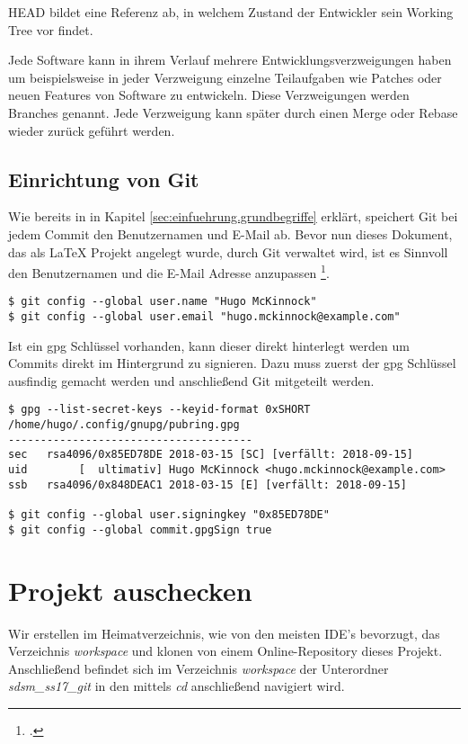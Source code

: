HEAD bildet eine Referenz ab, in welchem Zustand der Entwickler sein Working Tree vor findet. 

Jede Software kann in ihrem Verlauf mehrere Entwicklungsverzweigungen haben um beispielsweise in jeder Verzweigung einzelne Teilaufgaben wie Patches oder neuen Features von Software zu entwickeln. Diese Verzweigungen werden Branches genannt. Jede Verzweigung kann später durch einen Merge oder Rebase wieder zurück geführt werden.


\label{sec:einfuehrung.git}
\subsection{Einrichtung von Git}
Wie bereits in in Kapitel \ref{sec:einfuehrung.grundbegriffe} erklärt, speichert Git bei jedem Commit den Benutzernamen und E-Mail ab. Bevor nun dieses Dokument, das als \LaTeX{} Projekt angelegt wurde, durch Git verwaltet wird, ist es Sinnvoll den Benutzernamen und die E-Mail Adresse anzupassen \footcite{git-1.6-your-identity}.

\begin{verbatim}
$ git config --global user.name "Hugo McKinnock"
$ git config --global user.email "hugo.mckinnock@example.com"
\end{verbatim}

Ist ein gpg Schlüssel vorhanden, kann dieser direkt hinterlegt werden um Commits direkt im Hintergrund zu signieren. Dazu muss zuerst der gpg Schlüssel ausfindig gemacht werden und anschließend Git mitgeteilt werden.

\begin{verbatim}
$ gpg --list-secret-keys --keyid-format 0xSHORT
/home/hugo/.config/gnupg/pubring.gpg
--------------------------------------
sec   rsa4096/0x85ED78DE 2018-03-15 [SC] [verfällt: 2018-09-15]
uid        [  ultimativ] Hugo McKinnock <hugo.mckinnock@example.com>
ssb   rsa4096/0x848DEAC1 2018-03-15 [E] [verfällt: 2018-09-15]

$ git config --global user.signingkey "0x85ED78DE"
$ git config --global commit.gpgSign true
\end{verbatim}

\section{Projekt auschecken}
Wir erstellen im Heimatverzeichnis, wie von den meisten IDE's bevorzugt, das Verzeichnis \textit{workspace} und klonen von einem Online-Repository dieses Projekt. Anschließend befindet sich im Verzeichnis \textit{workspace} der Unterordner \textit{sdsm\_ss17\_git} in den mittels \textit{cd} anschließend navigiert wird.

